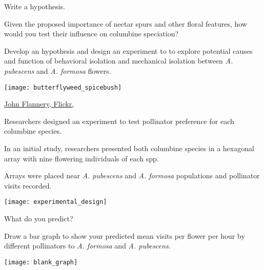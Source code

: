 \documentclass[t,hidelinks]{beamer}
\begin{document}
%
\begin{frame}[t]{Write a hypothesis.}
	
	\begin{multicols}{2}
	\hangpara Given the proposed importance of nectar spurs and other floral features, how would you test their influence on columbine speciation?

	\hangpara Develop an hypothesis and design an experiment to  to explore potential causes and function of behavioral isolation and mechanical isolation between \textit{A. pubescens} and \textit{A. formosa} flowers.

	\columnbreak
	
		\texttt{[image: butterflyweed\_spicebush]}
	\end{multicols}

	\vfilll
	
	\hfill \tiny \href{https://www.flickr.com/photos/drphotomoto/3638805249}{John Flannery, Flickr, }
\end{frame}
%
\begin{frame}[t]{Researchers designed an experiment to test pollinator preference for each columbine species.}
	
	\begin{multicols}{2}
	\hangpara In an initial study, researchers presented both columbine species in a hexagonal array with nine flowering individuals of each spp. 
	
	\hangpara Arrays were placed near \textit{A. pubescens} and \textit{A. formosa} populations and pollinator visits recorded.
	
	\hangpara {}

	\columnbreak
	
		\texttt{[image: experimental\_design]}
	\end{multicols}

\end{frame}
%
\begin{frame}[t]{What do you predict?}
	
	\vspace*{-\baselineskip}
	
	\hangpara Draw a bar graph to show your predicted mean visits per flower per hour by different pollinators to \textit{A. formosa} and \textit{A. pubescens}.
	
	\bigskip
	
	{\centering
		\texttt{[image: blank\_graph]}\par
	}
	
\end{frame}
\end{document}
